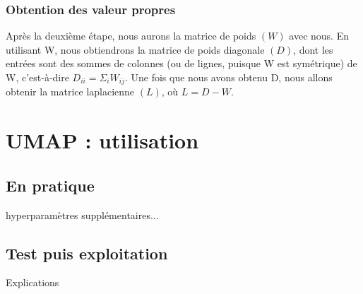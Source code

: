             \subsubsection*{Obtention des valeur propres}
            Après la deuxième étape, nous aurons la matrice de poids $(W)$ avec nous. En utilisant W, nous obtiendrons la matrice de poids diagonale $(D)$, dont les entrées sont des sommes de colonnes (ou de lignes, puisque W est symétrique) de W, c'est-à-dire $D_{ii} = \Sigma_i W_{ij}$. Une fois que nous avons obtenu D, nous allons obtenir la matrice laplacienne $(L)$, où $L = D-W$.










    \section{UMAP : utilisation}
        \subsection{En pratique}
        hyperparamètres supplémentaires...

        \subsection{Test puis exploitation}
        Explications